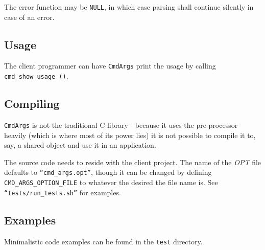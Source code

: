 \documentclass[a4paper,11pt]{article}
\begin{document}
The error function may be \texttt{NULL}, in which case parsing shall continue silently in case of an error.

\subsection{Usage}

The client programmer can have \texttt{CmdArgs} print the usage by calling \texttt{cmd\_show\_usage ()}.

\subsection{Compiling}

\texttt{CmdArgs} is not the traditional C library - because it uses the pre-processor heavily (which is where most of its power lies) it is not possible to compile it to, say, a shared object and use it in an application.

The source code needs to reside with the client project. The name of the \textit{OPT} file defaults to \texttt{``cmd\_args.opt''}, though it can be changed by defining \texttt{CMD\_ARGS\_OPTION\_FILE} to whatever the desired the file name is. See \texttt{``tests/run\_tests.sh''} for examples.

\subsection{Examples}

Minimalistic code examples can be found in the \texttt{test} directory.
\end{document}
